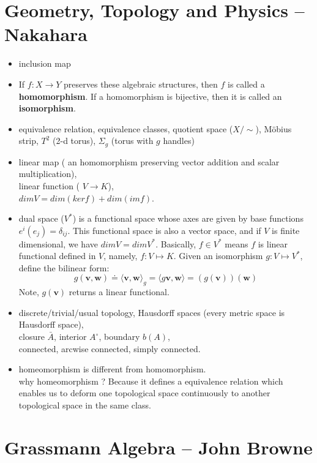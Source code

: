 \documentclass[12pt]{book}
\begin{document}
\chapter{Geometry, Topology and Physics -- Nakahara}
\begin{itemize}
\item inclusion map
\item 
  If $f:X\to Y$ preserves these algebraic structures, then $f$ is called a \textbf{homomorphism}.
  If a homomorphism is bijective, then it is called an \textbf{isomorphism}.
\item
  equivalence relation, equivalence classes, quotient space ($X/\sim$), M\"{o}bius strip,
  $T^2$ (2-d torus), $\Sigma_g$ (torus with $g$ handles)
\item
  linear map ( an homomorphism preserving vector addition and scalar multiplication), \\
  linear function ( $V \to K$), \\
  $dim V = dim(ker f) + dim(im f)$.
\item
  dual space ($V^*$) is a functional space whose axes are given by base functions 
  $e^{i}(e_j)=\delta_{ij}$. This functional space is also a vector space, and if $V$ 
  is finite dimensional, we have $dim V = dim V^*$. Basically, $f \in V^*$ means 
  $f$ is linear functional defined in $V$, namely, $f:V\mapsto K$. Given an isomorphism 
  $g : V\mapsto V^*$, define the bilinear form:
  \[
    g(\mathbf{v}, \mathbf{w}) \doteq \langle \mathbf{v}, \mathbf{w} \rangle_{g} 
    = \langle g\mathbf{v}, \mathbf{w} \rangle
    = (g(\mathbf{v}))(\mathbf{w})
  \]
  Note, $g(\mathbf{v})$ returns a linear functional.
\item
  discrete/trivial/usual topology,  Hausdorff spaces (every metric space is Hausdorff space), \\
  closure $\bar{A}$, interior $A^\circ$, boundary $b(A)$, \\
  connected, arcwise connected, simply connected.
\item
  homeomorphism is different from homomorphism. \\
  why homeomorphism ? Because it defines a equivalence relation which enables us to deform one 
  topological space continuously to another topological space in the same class. 
\end{itemize}

\chapter{Grassmann Algebra -- John Browne}
\end{document}
